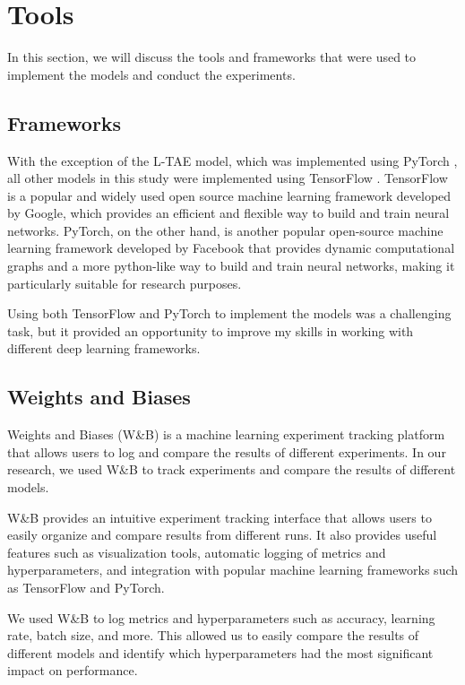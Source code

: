 \chapter{Tools}

In this section, we will discuss the tools and frameworks that were used to implement the models and conduct the experiments.

\section{Frameworks}

With the exception of the L-TAE model, which was implemented using PyTorch \cite{NEURIPS2019_9015}, all other models in this study were implemented using TensorFlow \cite{tensorflow2015-whitepaper}.
TensorFlow is a popular and widely used open source machine learning framework developed by Google, which provides an efficient and flexible way to build and train neural networks.
PyTorch, on the other hand, is another popular open-source machine learning framework developed by Facebook that provides dynamic computational graphs and a more python-like way to build and train neural networks, making it particularly suitable for research purposes.

Using both TensorFlow and PyTorch to implement the models was a challenging task, but it provided an opportunity to improve my skills in working with different deep learning frameworks.


\section{Weights and Biases}

Weights and Biases (W\&B) \cite{wandb} is a machine learning experiment tracking platform that allows users to log and compare the results of different experiments. 
In our research, we used W\&B to track experiments and compare the results of different models.

W\&B provides an intuitive experiment tracking interface that allows users to easily organize and compare results from different runs.
It also provides useful features such as visualization tools, automatic logging of metrics and hyperparameters, and integration with popular machine learning frameworks such as TensorFlow and PyTorch.

We used W\&B to log metrics and hyperparameters such as accuracy, learning rate, batch size, and more. 
This allowed us to easily compare the results of different models and identify which hyperparameters had the most significant impact on performance.


